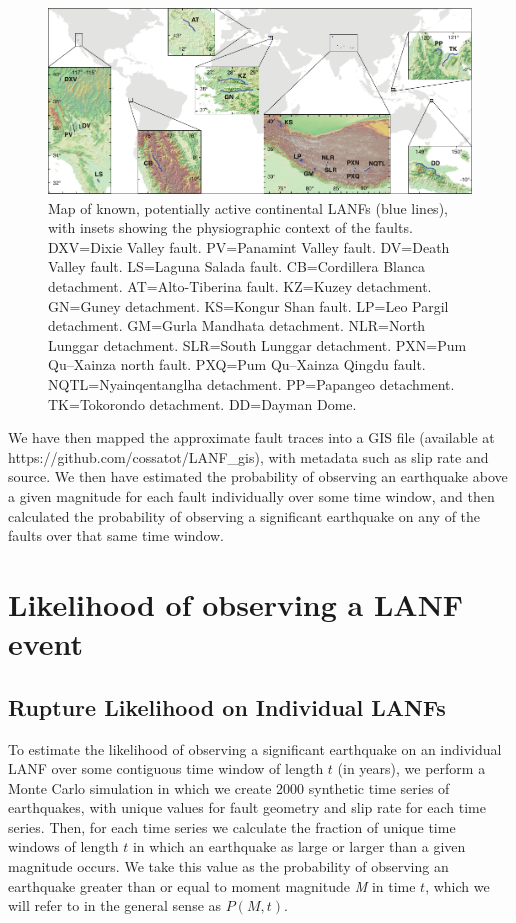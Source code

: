 \documentclass[twocolumn,grl]{AGUTeX}
\begin{document}
\begin{article}
\begin{figure}
\noindent\includegraphics[width=40pc]{./figures/active_lanfs_map_insets.pdf}
\caption{Map of known, potentially active continental LANFs (blue lines), with insets showing the physiographic context of the faults.  DXV=Dixie Valley fault.  PV=Panamint Valley fault.  DV=Death Valley fault.  LS=Laguna Salada fault.  CB=Cordillera Blanca detachment.  AT=Alto-Tiberina fault.  KZ=Kuzey detachment.  GN=Guney detachment.  KS=Kongur Shan fault.  LP=Leo Pargil detachment.  GM=Gurla Mandhata detachment. NLR=North Lunggar detachment.  SLR=South Lunggar detachment.  PXN=Pum Qu--Xainza north fault.  PXQ=Pum Qu--Xainza Qingdu fault.  NQTL=Nyainqentanglha detachment.  PP=Papangeo detachment.  TK=Tokorondo detachment.  DD=Dayman Dome.}
\label{fig:lanf_map}
\end{figure}

We have then mapped the approximate fault traces into a GIS file (available at https://github.com/cossatot/LANF\_gis), with metadata such as slip rate and source. We then have estimated the probability of observing an earthquake above a given magnitude for each fault individually over some time window, and then calculated the probability of observing a significant earthquake on any of the faults over that same time window.

\section{Likelihood of observing a LANF event}
\subsection{Rupture Likelihood on Individual LANFs}
To estimate the likelihood of observing a significant earthquake on an individual LANF over some contiguous time window of length $t$ (in years), we perform a Monte Carlo simulation in which we create 2000 synthetic time series of earthquakes, with unique values for fault geometry and slip rate for each time series. Then, for each time series we calculate the fraction of unique time windows of length $t$ in which an earthquake as large or larger than a given magnitude occurs.  We take this value as the probability of observing an earthquake greater than or equal to moment magnitude \emph{M} in time $t$, which we will refer to in the general sense as $P(M,t)$.


\end{article}
\end{document}

